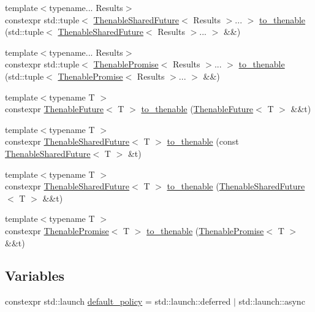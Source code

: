 \begin{DoxyCompactItemize}
\item 
{\footnotesize template$<$typename... Results$>$ }\\constexpr std\+::tuple$<$ \hyperlink{classthenable_1_1_thenable_shared_future}{Thenable\+Shared\+Future}$<$ Results $>$... $>$ \hyperlink{namespacethenable_a88f476e06ebe003343ceb2139897ab5b}{to\+\_\+thenable} (std\+::tuple$<$ \hyperlink{classthenable_1_1_thenable_shared_future}{Thenable\+Shared\+Future}$<$ Results $>$... $>$ \&\&)
\item 
{\footnotesize template$<$typename... Results$>$ }\\constexpr std\+::tuple$<$ \hyperlink{classthenable_1_1_thenable_promise}{Thenable\+Promise}$<$ Results $>$... $>$ \hyperlink{namespacethenable_a98c92776f4ed0bbe5316b978e575d011}{to\+\_\+thenable} (std\+::tuple$<$ \hyperlink{classthenable_1_1_thenable_promise}{Thenable\+Promise}$<$ Results $>$... $>$ \&\&)
\item 
{\footnotesize template$<$typename T $>$ }\\constexpr \hyperlink{classthenable_1_1_thenable_future}{Thenable\+Future}$<$ T $>$ \hyperlink{namespacethenable_a79883ce5869d4c3be2a76be8c0509e3d}{to\+\_\+thenable} (\hyperlink{classthenable_1_1_thenable_future}{Thenable\+Future}$<$ T $>$ \&\&t)
\item 
{\footnotesize template$<$typename T $>$ }\\constexpr \hyperlink{classthenable_1_1_thenable_shared_future}{Thenable\+Shared\+Future}$<$ T $>$ \hyperlink{namespacethenable_a1a414f7826f8a57f7ad134e09a8b864b}{to\+\_\+thenable} (const \hyperlink{classthenable_1_1_thenable_shared_future}{Thenable\+Shared\+Future}$<$ T $>$ \&t)
\item 
{\footnotesize template$<$typename T $>$ }\\constexpr \hyperlink{classthenable_1_1_thenable_shared_future}{Thenable\+Shared\+Future}$<$ T $>$ \hyperlink{namespacethenable_a5e7e45908f58bd51111c8286ca423101}{to\+\_\+thenable} (\hyperlink{classthenable_1_1_thenable_shared_future}{Thenable\+Shared\+Future}$<$ T $>$ \&\&t)
\item 
{\footnotesize template$<$typename T $>$ }\\constexpr \hyperlink{classthenable_1_1_thenable_promise}{Thenable\+Promise}$<$ T $>$ \hyperlink{namespacethenable_a5053e8ddbc047a3030ab818ce04982aa}{to\+\_\+thenable} (\hyperlink{classthenable_1_1_thenable_promise}{Thenable\+Promise}$<$ T $>$ \&\&t)
\end{DoxyCompactItemize}
\subsection*{Variables}
\begin{DoxyCompactItemize}
\item 
constexpr std\+::launch \hyperlink{namespacethenable_a55a20a452e9ba9c0eff946d9b8636f06}{default\+\_\+policy} = std\+::launch\+::deferred $\vert$ std\+::launch\+::async
\end{DoxyCompactItemize}


